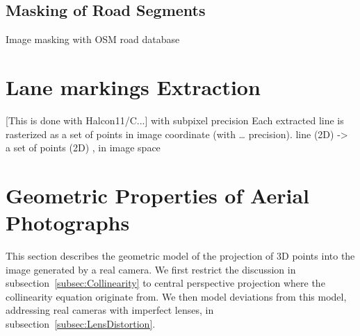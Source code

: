 \subsection{Masking of Road Segments}
Image masking with OSM road database



\section{Lane markings Extraction}
\label{sec:LineExtraction}
[This is done with Halcon11/C...]
with subpixel precision
Each extracted line is rasterized as a set of points in image coordinate (with … precision).
line (2D) -> a set of points (2D) , in image space






\section{Geometric Properties of Aerial Photographs}
\label{sec:Geometry}

This section describes the geometric model of the projection of 3D points into the image generated by a real camera. We first restrict the discussion in subsection~\ref{subsec:Collinearity} to central perspective projection where the collinearity equation originate from. We then model deviations from this model, addressing real cameras with imperfect lenses, in subsection~\ref{subsec:LensDistortion}.

